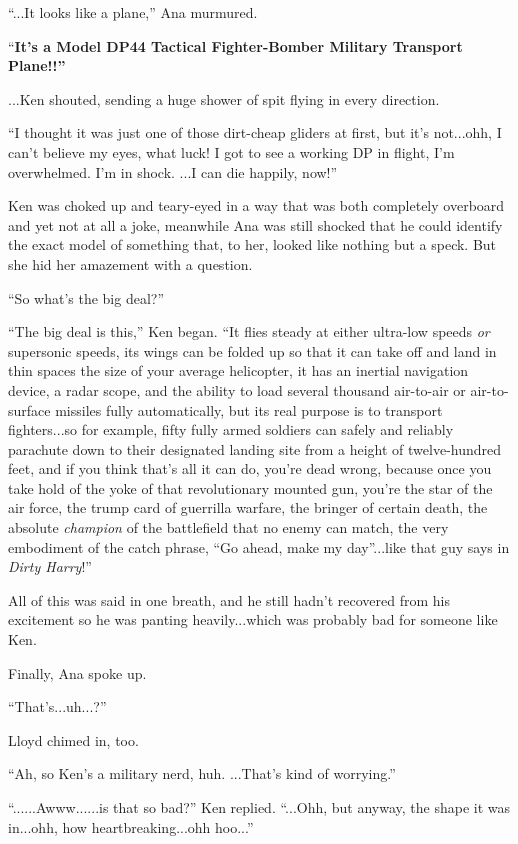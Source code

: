\documentclass[
]{article}
\begin{document}
``...It looks like a plane,'' Ana murmured.

``\textbf{It's a Model DP44 Tactical Fighter-Bomber Military Transport
Plane!!''}

...Ken shouted, sending a huge shower of spit flying in every direction.

``I thought it was just one of those dirt-cheap gliders at first, but
it's not...ohh, I can't believe my eyes, what luck! I got to see a
working DP in flight, I'm overwhelmed. I'm in shock. ...I can die
happily, now!''

Ken was choked up and teary-eyed in a way that was both completely
overboard and yet not at all a joke, meanwhile Ana was still shocked
that he could identify the exact model of something that, to her, looked
like nothing but a speck. But she hid her amazement with a question.

``So what's the big deal?''

``The big deal is this,'' Ken began. ``It flies steady at either
ultra-low speeds \emph{or} supersonic speeds, its wings can be folded up
so that it can take off and land in thin spaces the size of your average
helicopter, it has an inertial navigation device, a radar scope, and the
ability to load several thousand air-to-air or air-to-surface missiles
fully automatically, but its real purpose is to transport fighters...so
for example, fifty fully armed soldiers can safely and reliably
parachute down to their designated landing site from a height of
twelve-hundred feet, and if you think that's all it can do, you're dead
wrong, because once you take hold of the yoke of that revolutionary
mounted gun, you're the star of the air force, the trump card of
guerrilla warfare, the bringer of certain death, the absolute
\emph{champion} of the battlefield that no enemy can match, the very
embodiment of the catch phrase, ``Go ahead, make my day''...like that
guy says in \emph{Dirty Harry}!''

All of this was said in one breath, and he still hadn't recovered from
his excitement so he was panting heavily...which was probably bad for
someone like Ken.

Finally, Ana spoke up.

``That's...uh...?''

Lloyd chimed in, too.

``Ah, so Ken's a military nerd, huh. ...That's kind of worrying.''

``......Awww......is that so bad?'' Ken replied. ``...Ohh, but anyway,
the shape it was in...ohh, how heartbreaking...ohh hoo...''
\end{document}
